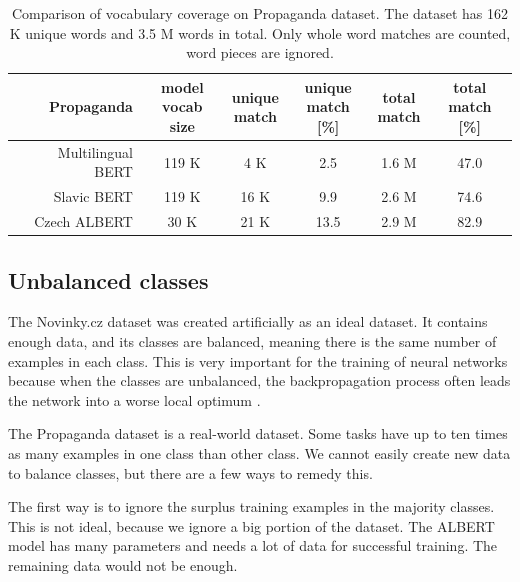 \documentclass[
  printed, %
  color,   %
  table,   %
  oneside, %
  lof,     %
  lot,     %
]{fithesis3}
\begin{document}
\begin{table}[t!]
\small
\begin{tabular}{r|c|c|c|c|c}
        Propaganda
        & \rotatebox[origin=l]{90}{\parbox{2.2cm}{model \\ vocab size}} 
        & \rotatebox[origin=l]{90}{\parbox{2cm}{unique \\ match}}
        & \rotatebox[origin=l]{90}{\parbox{2cm}{unique \\ match [\%]}}
        & \rotatebox[origin=l]{90}{\parbox{2cm}{total \\ match}}
        & \rotatebox[origin=l]{90}{\parbox{2cm}{total \\ match [\%]}}
        \\ 
    \toprule
    Multilingual BERT      & 119 K  & 4 K   & 2.5  & 1.6 M   & 47.0 \\
    Slavic BERT            & 119 K  & 16 K  & 9.9  & 2.6 M   & 74.6 \\
    Czech ALBERT           & 30 K   & 21 K  & 13.5 & 2.9 M   & 82.9 \\ 
\end{tabular}
\caption[Vocabulary coverage on Propaganda dataset]
{Comparison of vocabulary coverage on Propaganda dataset. The dataset has 162 K unique words and 3.5 M words in total. Only whole word matches are counted, word pieces are ignored.}
\label{tab:vocab-prop-compare}
\end{table} %



\subsection{Unbalanced classes}
The Novinky.cz dataset was created artificially as an ideal dataset. It contains enough data, and its classes are balanced, meaning there is the same number of examples in each class. This is very important for the training of neural networks because when the classes are unbalanced, the backpropagation process often leads the network into a worse local optimum \parencite{unbalanced}.

The Propaganda dataset is a real-world dataset. Some tasks have up to ten times as many examples in one class than other class. We cannot easily create new data to balance classes, but there are a few ways to remedy this.

The first way is to ignore the surplus training examples in the majority classes. This is not ideal, because we ignore a big portion of the dataset. The ALBERT model has many parameters and needs a lot of data for successful training. The remaining data would not be enough.
\end{document}
